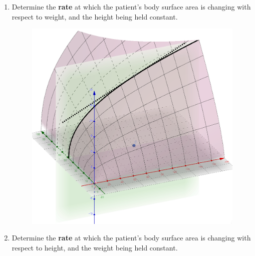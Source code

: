 \begin{example}
\begin{enumerate}[leftmargin=*]
    \newpage                                    
    \item Determine the \textbf{rate} at which the patient’s body surface area is changing with respect to weight, and the height being held constant. 
    \begin{figure}[h!]
        \flushleft
        \includegraphics[scale=0.5]{images/twoVariables/ex19_2b.png}
    \end{figure}
    \item Determine the \textbf{rate} at which the patient’s body surface area is changing with respect to height, and the weight being held constant.
    \begin{figure}[h!]
        \flushleft

\end{figure}
\end{enumerate}
\end{example}
